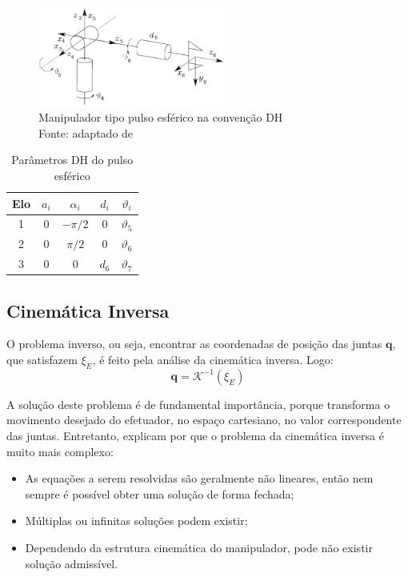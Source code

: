 \begin{figure}[h]
	\centering 
 	\includegraphics[width=0.55\textwidth]{figs/tipica_dh}
 	\caption[Manipulador tipo pulso esférico na convenção DH]
 	{Manipulador tipo pulso esférico na convenção DH \\
 	Fonte: adaptado	de~\cite{sciavicco2012modelling}}
 	\label{fig::tipica_dh}
\end{figure}

%
\begin{table}[h!]
\centering
\caption{Parâmetros DH do pulso esférico}
\label{tab::param_dh}
\begin{tabular}{@{}ccccc@{}}
\toprule
Elo & $a_i$ & $\alpha_i$ & $d_i$ & $\vartheta_i$ \\ \midrule
1   & 0     & $-\pi/2$   & 0     & $\vartheta_5$ \\
2   & 0     & $\pi/2$    & 0     & $\vartheta_6$ \\
3   & 0     & 0          & $d_6$ & $\vartheta_7$ \\ \bottomrule
\end{tabular}
\end{table}
%

\subsection{Cinemática Inversa}\label{sec::ikin}

O problema inverso, ou seja, encontrar as coordenadas de posição das juntas
$\mathbf{q}$, que satisfazem $\xi_{E}$, é feito pela análise da cinemática
inversa. Logo:
%
\begin{equation} \label{eq::invq}
	\mathbf{q} = \mathcal{K}^{-1}(\xi_{E})
\end{equation}
%

A solução deste problema é de fundamental importância, porque transforma o
movimento desejado do efetuador, no espaço cartesiano, no valor correspondente
das juntas. Entretanto, \citet{sciavicco2012modelling} explicam por que o
problema da cinemática inversa é muito mais complexo:
%
\begin{itemize}
  \item As equações a serem resolvidas são geralmente não lineares, então nem
  sempre é possível obter uma solução de forma fechada;
  \item Múltiplas ou infinitas soluções podem existir;
  \item Dependendo da estrutura cinemática do manipulador, pode não existir
  solução admissível.
\end{itemize}
%

